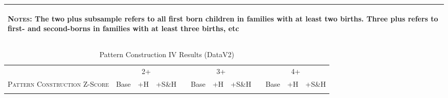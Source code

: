 \begin{landscape}
\begin{table}[htpb!]
\begin{center}
\begin{tabular}{lcccp{2mm}cccp{2mm}ccc}
\midrule\multicolumn{12}{p{19.2cm}}{\begin{footnotesize}\textsc{Notes:} The two plus subsample refers to all first born children in families with at least two births.  Three plus refers to first- and second-borns in families with at least three births, etc\end{footnotesize}} \\ \bottomrule 
\end{tabular}\end{center}\end{table}\end{landscape}\begin{landscape}\begin{table}[htpb!]\caption{Pattern Construction IV Results (DataV2)}
\label{TWINtab:IVAll}
\begin{center}\begin{tabular}{lcccp{2mm}cccp{2mm}ccc}
\toprule \toprule 
&\multicolumn{3}{c}{2+}&&\multicolumn{3}{c}{3+}&&\multicolumn{3}{c}{4+}\\ \cmidrule(r){2-4} \cmidrule(r){6-8} \cmidrule(r){10-12} 
\textsc{Pattern Construction Z-Score}&Base&+H&+S\&H&&Base&+H&+S\&H&&Base&+H&+S\&H\\ \midrule 
\begin{footnotesize}\end{footnotesize}& 
\begin{footnotesize}\end{footnotesize}& 
\begin{footnotesize}\end{footnotesize}& 
\begin{footnotesize}\end{footnotesize}& 
\begin{footnotesize}\end{footnotesize}& 
\begin{footnotesize}\end{footnotesize}& 
\begin{footnotesize}\end{footnotesize}& 
\begin{footnotesize}\end{footnotesize}& 
\begin{footnotesize}\end{footnotesize}& 
\begin{footnotesize}\end{footnotesize}& 
\begin{footnotesize}\end{footnotesize}& 

\end{tabular}
\end{center}
\end{table}
\end{landscape}

